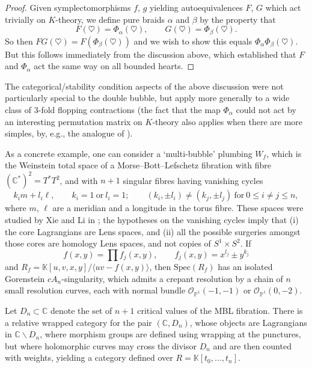 \documentclass[pdftex]{sigma}
\def\bK{\mathbb{K}}
\def\bP{\mathbb{P}}
\def\bC{\mathbb{C}}
\theoremstyle{definition}
\numberwithin{equation}{section}
\begin{document}
\begin{proof}
Given symplectomorphisms $f$, $g$ yielding autoequivalences $F$, $G$ which act trivially on $K$-theory, we define pure braids $\alpha$ and $\beta$ by the property that
\[
F(\heartsuit) = \Phi_{\alpha}(\heartsuit), \qquad G(\heartsuit) = \Phi_{\beta}(\heartsuit).
\]
So then $FG(\heartsuit) = F(\Phi_{\beta}(\heartsuit))$ and we wish to show this equals $\Phi_{\alpha}\Phi_{\beta}(\heartsuit)$. But this follows immediately from the discussion above, which established that $F$ and $\Phi_\alpha$ act the same way on all bounded hearts.
\end{proof}

The categorical/stability condition aspects of the above discussion were not particularly special to the double bubble, but apply more generally to a wide class of 3-fold flopping contractions (the fact that the map $\Phi_{\alpha}$ could not act by an interesting permutation matrix on $K$-theory also applies when there are more simples, by, e.g., the analogue of \cite[Proposition~2.12]{August-Wemyss}).

 As a concrete example, one can consider a `multi-bubble' plumbing $W_f$, which is the Weinstein total space of a Morse--Bott--Lefschetz fibration with fibre $(\bC^*)^2 = T^*T^2$, and with $n+1$ singular fibres having vanishing cycles
 \[
 k_i m + l_i \ell, \qquad k_i = 1 \ \mathrm{or} \ l_i = 1; \qquad (k_i, \pm l_i) \neq (k_j, \pm l_j) \ \mathrm{for} \ 0\leq i\neq j \leq n,
 \]
 where $m$, $\ell$ are a meridian and a longitude in the torus fibre. These spaces were studied by Xie and Li in \cite{Xie-Li}; the hypotheses on the vanishing cycles imply that (i) the core Lagrangians are Lens spaces, and (ii) all the possible surgeries amongst those cores are homology Lens spaces, and not copies of $S^1\times S^2$.
 If
 \[
 f(x,y) = \prod f_j(x,y), \qquad f_j(x,y) = x^{l_j} \pm y^{k_j}
 \]
 and $R_f = \bK[u,v,x,y] / \langle uv-f(x,y)\rangle$, then $\mathrm{Spec}(R_f)$ has an isolated Gorenstein $cA_n$-singularity, which admits a crepant resolution by a chain of $n$ small resolution curves, each with normal bundle $\mathcal{O}_{\bP^1}(-1,-1)$ or $\mathcal{O}_{\bP^1}(0,-2)$.

Let $D_n \subset \bC$ denote the set of $n+1$ critical values of the MBL fibration. There is a relative wrapped category for the pair $(\bC,D_n)$, whose objects are Lagrangians in $\bC\backslash D_n$, where morphism groups are defined using wrapping at the punctures, but where holomorphic curves may cross the divisor $D_n$ and are then counted with weights, yielding a category defined over $R = \bK[t_0,\dots,t_n]$.
\end{document}
